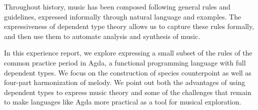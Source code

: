 Throughout history, music has been composed following general rules
and guidelines, expressed informally through natural language and
examples. The expressiveness of dependent type theory allows us to
capture these rules formally, and then use them to automate
analysis and synthesis of music.

In this experience report, we explore expressing a small subset of the
rules of the common practice period in Agda, a functional programming
language with full dependent types. We focus on the construction of
species counterpoint as well as four-part harmonization of melody. We
point out both the advantages of using dependent types to express
music theory and some of the challenges that remain to make
languages like Agda more practical as a tool for musical exploration.